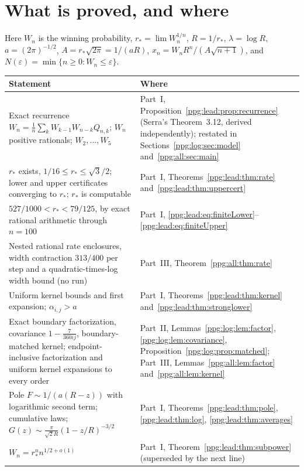 \documentclass[11pt,letterpaper]{article}
\theoremstyle{remark}\newtheorem{remark}[theorem]{Remark}
\numberwithin{equation}{section}
\begin{document}
\section*{What is proved, and where}\label{ppg:sec:status}
Here $W_n$ is the winning probability, $r_*=\lim W_n^{1/n}$, $R=1/r_*$, $\lambda=\log R$, $a=(2\pi)^{-1/2}$, $A=r_*\sqrt{2\pi}=1/(aR)$, $x_n=W_nR^n/(A\sqrt{n+1})$, and $N(\varepsilon)=\min\{n\ge0:W_n\le\varepsilon\}$.
\begin{center}
\small
\begin{longtable}{@{}>{\raggedright\arraybackslash}p{} >{\raggedright\arraybackslash}p{}@{}}
\toprule
Statement & Where\\
\midrule
\endhead
Exact recurrence $W_n=\frac1n\sum_kW_{k-1}W_{n-k}Q_{n,k}$; $W_n$ positive rationals; $W_2,\ldots,W_5$ & Part~I, Proposition~\ref{ppg:lead:prop:recurrence} (Serra's Theorem~3.12, derived independently); restated in Sections~\ref{ppg:log:sec:model} and~\ref{ppg:all:sec:main}\\
$r_*$ exists, $1/16\le r_*\le\sqrt3/2$; lower and upper certificates converging to $r_*$; $r_*$ is computable & Part~I, Theorems~\ref{ppg:lead:thm:rate} and~\ref{ppg:lead:thm:uppercert}\\
$527/1000<r_*<79/125$, by exact rational arithmetic through $n=100$ & Part~I, \eqref{ppg:lead:eq:finiteLower}--\eqref{ppg:lead:eq:finiteUpper}\\
Nested rational rate enclosures, width contraction $313/400$ per step and a quadratic-times-log width bound (no run) & Part~III, Theorem~\ref{ppg:all:thm:rate}\\
Uniform kernel bounds and first expansion; $\alpha_{i,j}>a$ & Part~I, Theorems~\ref{ppg:lead:thm:kernel} and~\ref{ppg:lead:thm:stronglower}\\
Exact boundary factorization, covariance $1-\frac7{360ij}$, boundary-matched kernel; endpoint-inclusive factorization and uniform kernel expansions to every order & Part~II, Lemmas~\ref{ppg:log:lem:factor}, \ref{ppg:log:lem:covariance}, Proposition~\ref{ppg:log:prop:matched}; Part~III, Lemmas~\ref{ppg:all:lem:factor} and~\ref{ppg:all:lem:kernel}\\
Pole $F\sim1/(a(R-z))$ with logarithmic second term; cumulative laws; $G(z)\sim\frac{\pi}{\sqrt2R}(1-z/R)^{-3/2}$ & Part~I, Theorems~\ref{ppg:lead:thm:pole}, \ref{ppg:lead:thm:log}, \ref{ppg:lead:thm:averages}\\
$W_n=r_*^nn^{1/2+o(1)}$ & Part~I, Theorem~\ref{ppg:lead:thm:subpower} (superseded by the next line)\\

\end{longtable}
\end{center}
\end{document}
